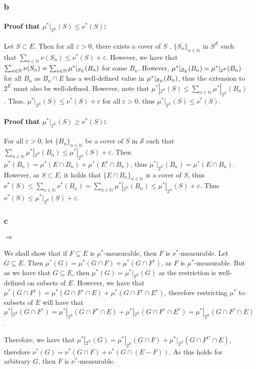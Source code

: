 \documentclass{article}
\theoremstyle{definition}
\numberwithin{theorem}{section}
\numberwithin{equation}{section}
\newcommand{\sig}{\mathcal{S}}
\begin{document}
\subsubsection{b}
\paragraph{Proof that $\mu^*|_{2^E}(S) \leq \nu^*(S)$:}
Let $S \subset E$. Then for all $\varepsilon > 0$, there exists a cover of $S$ , $\lbrace S_n \rbrace_{n \in \mathbb{N}}$ in $S^E$ such that $\sum_{n \in \mathbb{N}} \nu(S_n) \leq \nu^*(S) + \varepsilon$. However, we have that $\sum_{n \in \mathbb{N}} \nu(S_n) = \sum_{n \in \mathbb{N}} \mu^*|_{\mathcal{S}_E}(B_n)$ for some $B_n$. However, $ \mu^*|_{\mathcal{S}_E}(B_n) = \mu^*|_{2^E}(B_n)$ for all $B_n$ as $B_n \cap E$ has a well-defined value in $\mu^*|_{\mathcal{S}_E}(B_n)$, thus the extension to $2^E$ must also be well-defined. However, note that $\mu^*|_{2^E}(S) \leq \sum_{n \in \mathbb{N}} \mu^*|_{2^E}(B_n)$. Thus, $\mu^*|_{2^E}(S) \leq \nu^*(S) + \varepsilon$ for all $\varepsilon > 0$, thus $ \mu^*|_{2^E}(S) \leq \nu^*(S) $.
\paragraph{Proof that $\mu^*|_{2^E}(S) \geq \nu^*(S)$:}
For all $\varepsilon > 0$, let $\lbrace B_n \rbrace_{n \in \mathbb{N}}$ be a cover of $S$ in $\sig$ such that $\sum_{n \in \mathbb{N}}\mu^*|_{2^E}(B_n) \leq \mu^*|_{2^E}(S) + \varepsilon$. Then $\mu^*(B_n) = \mu^*(E \cap B_n) + \mu^*(E^c \cap B_n)$, thus $\mu^*|_{2^E}(B_n) = \mu^*(E \cap B_n)$. However, as $S \subset E$, it holds that $ \lbrace E \cap B_n \rbrace_{n \in \mathbb{N}}$ is a cover of $S$, thus $\nu^*(S) \leq \sum_{n \in \mathbb{N}}\nu^*(B_n) = \sum_{n \in \mathbb{N}}\mu^*|_{2^E}(B_n) \leq \mu^*|_{2^E}(S) + \varepsilon$. Thus $\nu^*(S) \leq \mu^*|_{2^E}(S) + \varepsilon$. 
\subsubsection{c}
\paragraph{$\Rightarrow$}
We shall show that if $F \subseteq E$ is $\mu^*$-measurable, then $F$ is $\nu^*$-measurable. Let $G \subseteq E$. Then $\mu^*(G) = \mu^*(G \cap F) + \mu^*(G \cap F^c)$, as $F$ is $\mu^*$-measurable. But as we have that $G \subseteq E$, then $\mu^*(G) = \mu^*|_{2^E}(G)$ as the restriction is well-defined on subsets of $E$. However, we have that $\mu^* (G \cap F^c) = \mu^*(G \cap F^c \cap E) + \mu^*(G \cap F^c \cap E^c)$, therefore restricting $\mu^*$ to subsets of $E$ will have that $\mu^*|_{2^E}(G \cap F^c) = \mu^*|_{2^E}(G \cap F^c \cap E) +  \mu^*|_{2^E}(G \cap F^c \cap E^c) = \mu^*|_{2^E}(G \cap F^c \cap E)$.
\par
Therefore, we have that $\mu^*|_{2^E}(G) = \mu^*|_{2^E}(G \cap F) + \mu^*|_{2^E}(G \cap F^C \cap E)$, therefore $\nu^*(G) = \nu^*(G \cap F) + \nu^*(G \cap (E- F))$. As this holds for arbitrary $G$, then $F$ is $\nu^*$-measurable.
\end{document}
